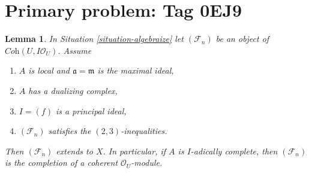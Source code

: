 \documentclass{amsart}
\theoremstyle{plain}
\newtheorem{lemma}[subsection]{Lemma}
\theoremstyle{definition}
\theoremstyle{remark}
\numberwithin{equation}{subsection}
\begin{document}
\section*{Primary problem: Tag 0EJ9}
\begin{lemma}
\label{lemma-algebraization-principal-bis}
In Situation \ref{situation-algebraize} let $(\mathcal{F}_n)$ be an object
of $\textit{Coh}(U, I\mathcal{O}_U)$. Assume
\begin{enumerate}
\item $A$ is local and $\mathfrak a = \mathfrak m$ is the maximal ideal,
\item $A$ has a dualizing complex,
\item $I = (f)$ is a principal ideal,
\item $(\mathcal{F}_n)$ satisfies the $(2, 3)$-inequalities.
\end{enumerate}
Then $(\mathcal{F}_n)$ extends to $X$. In particular, if $A$ is
$I$-adically complete, then $(\mathcal{F}_n)$ is the completion
of a coherent $\mathcal{O}_U$-module. 
\end{lemma}
\end{document}
